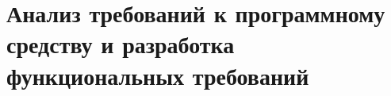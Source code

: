 \section{Анализ требований к программному средству и разработка функциональных требований}
\label{sec:domain}


